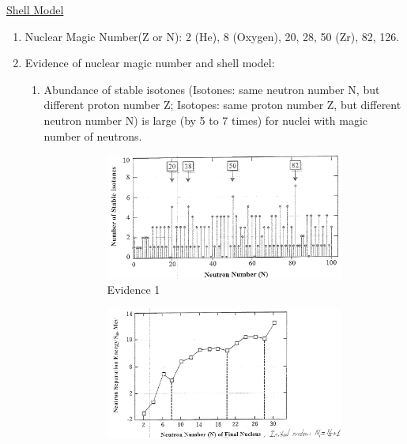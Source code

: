 \documentclass{school-22.101-notes}
\date{December 16, 2011}
\begin{document}
\maketitle


\clearpage
{}
\uline{Shell Model}
\begin{enumerate}
\item Nuclear Magic Number(Z or N): 2 (He), 8 (Oxygen), 20, 28, 50 (Zr), 82, 126. 
\item Evidence of nuclear magic number and shell model:
\begin{enumerate}
\item Abundance of stable isotones (Isotones: same neutron number N, but different proton number Z; Isotopes: same proton number Z, but different neutron number N) is large (by 5 to 7 times) for nuclei with magic number of neutrons.
\begin{figure}[ht]
  \centering
  \begin{subfigure}[b]{0.45\textwidth}
    \centering
    \includegraphics[width=\textwidth]{images/shell/shell-evidence-1.png}
    \caption{Evidence 1}
    \label{fig:111}
  \end{subfigure}
  \begin{subfigure}[b]{0.45\textwidth}
    \centering
    \includegraphics[width=\textwidth]{images/shell/shell-evidence-2.png}

\end{subfigure}
\end{figure}
\end{enumerate}
\end{enumerate}
\end{document}
